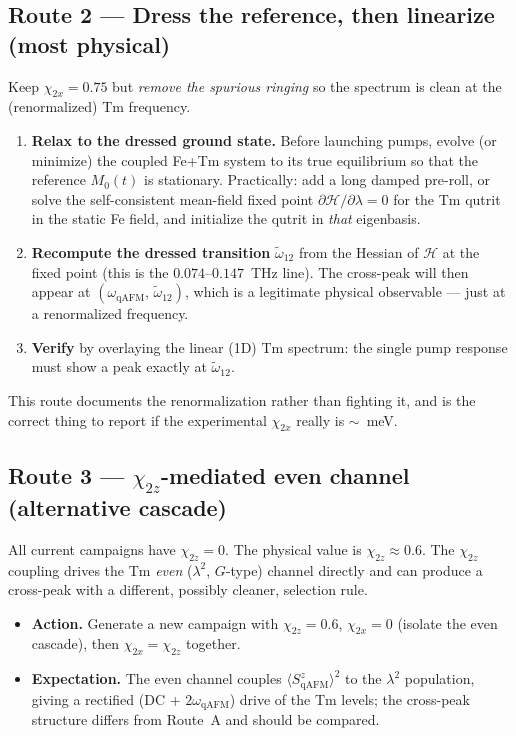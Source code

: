 \documentclass[11pt,a4paper]{article}
\newcommand{\Heff}{\mathcal{H}}
\newcommand{\qAFM}{\mathrm{qAFM}}
\newcommand{\chitwox}{\chi_{2x}}
\newcommand{\chitwoz}{\chi_{2z}}
\begin{document}
\subsection{Route 2 --- Dress the reference, then linearize (most physical)}
Keep $\chitwox=0.75$ but \emph{remove the spurious ringing} so the spectrum is
clean at the (renormalized) Tm frequency.
\begin{enumerate}[nosep]
  \item \textbf{Relax to the dressed ground state.} Before launching pumps,
        evolve (or minimize) the coupled Fe+Tm system to its true equilibrium so
        that the reference $M_0(t)$ is stationary. Practically: add a long
        damped pre-roll, or solve the self-consistent mean-field fixed point
        $\partial\Heff/\partial\lambda = 0$ for the Tm qutrit in the static Fe
        field, and initialize the qutrit in \emph{that} eigenbasis.
  \item \textbf{Recompute the dressed transition} $\tilde\omega_{12}$ from the
        Hessian of $\Heff$ at the fixed point (this is the $0.074$--$0.147$~THz
        line). The cross-peak will then appear at
        $(\omega_{\qAFM},\,\tilde\omega_{12})$, which is a legitimate physical
        observable --- just at a renormalized frequency.
  \item \textbf{Verify} by overlaying the linear (1D) Tm spectrum: the single
        pump response must show a peak exactly at $\tilde\omega_{12}$.
\end{enumerate}
This route documents the renormalization rather than fighting it, and is the
correct thing to report if the experimental $\chitwox$ really is $\sim$~meV.

\subsection{Route 3 --- $\chitwoz$-mediated even channel (alternative cascade)}
All current campaigns have $\chitwoz=0$. The physical value is
$\chitwoz\approx 0.6$. The $\chitwoz$ coupling drives the Tm \emph{even}
($\lambda^2$, $G$-type) channel directly and can produce a cross-peak with a
different, possibly cleaner, selection rule.
\begin{itemize}[nosep]
  \item \textbf{Action.} Generate a new campaign with $\chitwoz=0.6$,
        $\chitwox=0$ (isolate the even cascade), then $\chitwox=\chitwoz$
        together.
  \item \textbf{Expectation.} The even channel couples
        $\langle S_{\qAFM}^z\rangle^2$ to the $\lambda^2$ population, giving a
        rectified (DC + $2\omega_{\qAFM}$) drive of the Tm levels; the cross-peak
        structure differs from Route~A and should be compared.
\end{itemize}
\end{document}
